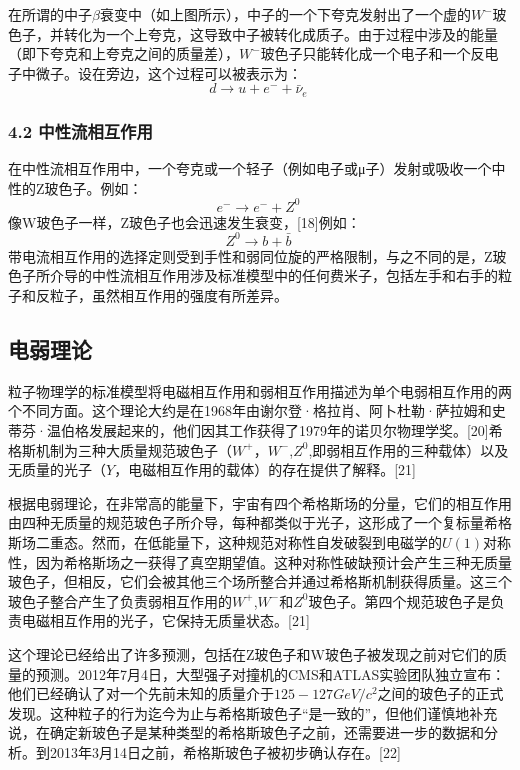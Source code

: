 在所谓的中子$\beta$衰变中（如上图所示），中子的一个下夸克发射出了一个虚的$W^-$玻色子，并转化为一个上夸克，这导致中子被转化成质子。由于过程中涉及的能量（即下夸克和上夸克之间的质量差），$W^-$玻色子只能转化成一个电子和一个反电子中微子。设在旁边，这个过程可以被表示为：
$$d \rightarrow u + e^{-} + \bar{\nu}_e~$$

\subsubsection{4.2 中性流相互作用}
在中性流相互作用中，一个夸克或一个轻子（例如电子或μ子）发射或吸收一个中性的Z玻色子。例如：
\begin{equation}
e^- \rightarrow e^- + Z^0~
\end{equation}
像W玻色子一样，Z玻色子也会迅速发生衰变，[18]例如：
\begin{equation}
Z^0 \rightarrow b + \bar{b}~
\end{equation}
带电流相互作用的选择定则受到手性和弱同位旋的严格限制，与之不同的是，Z玻色子所介导的中性流相互作用涉及标准模型中的任何费米子，包括左手和右手的粒子和反粒子，虽然相互作用的强度有所差异。

\subsection{电弱理论}
粒子物理学的标准模型将电磁相互作用和弱相互作用描述为单个电弱相互作用的两个不同方面。这个理论大约是在1968年由谢尔登·格拉肖、阿卜杜勒·萨拉姆和史蒂芬·温伯格发展起来的，他们因其工作获得了1979年的诺贝尔物理学奖。[20]希格斯机制为三种大质量规范玻色子（$W^{+}$，$W^{-}$,$Z^{0}$,即弱相互作用的三种载体）以及无质量的光子（$Y$，电磁相互作用的载体）的存在提供了解释。[21]

根据电弱理论，在非常高的能量下，宇宙有四个希格斯场的分量，它们的相互作用由四种无质量的规范玻色子所介导，每种都类似于光子，这形成了一个复标量希格斯场二重态。然而，在低能量下，这种规范对称性自发破裂到电磁学的$U(1)$对称性，因为希格斯场之一获得了真空期望值。这种对称性破缺预计会产生三种无质量玻色子，但相反，它们会被其他三个场所整合并通过希格斯机制获得质量。这三个玻色子整合产生了负责弱相互作用的$W^{+}$,$W^{-}$和$Z^{0}$玻色子。第四个规范玻色子是负责电磁相互作用的光子，它保持无质量状态。[21]

这个理论已经给出了许多预测，包括在Z玻色子和W玻色子被发现之前对它们的质量的预测。2012年7月4日，大型强子对撞机的CMS和ATLAS实验团队独立宣布：他们已经确认了对一个先前未知的质量介于$125-127GeV/c^{2}$之间的玻色子的正式发现。这种粒子的行为迄今为止与希格斯玻色子“是一致的”，但他们谨慎地补充说，在确定新玻色子是某种类型的希格斯玻色子之前，还需要进一步的数据和分析。到2013年3月14日之前，希格斯玻色子被初步确认存在。[22]

